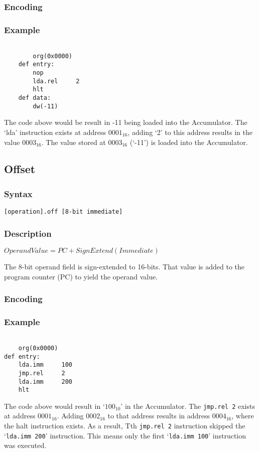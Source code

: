 \subsubsection{Encoding}
\subsubsection{Example}
\begin{verbatim}

        org(0x0000)
    def entry:
        nop
        lda.rel     2
        hlt
    def data:
        dw(-11)

\end{verbatim}
The code above would be result in -11 being loaded into the Accumulator.
The `lda' instruction exists at address $0001_{16}$, adding `2' to this address results in the value $0003_{16}$.
The value stored at $0003_{16}$ (`-11') is loaded into the Accumulator.
\pagebreak

\subsection{Offset}\label{subsec:relative-jump}
\subsubsection{Syntax}
\begin{verbatim}[operation].off [8-bit immediate]\end{verbatim}

\subsubsection{Description}
$OperandValue = PC + SignExtend(Immediate)$
\par The 8-bit operand field is sign-extended to 16-bits.
That value is added to the program counter (PC) to yield the operand value.

\subsubsection{Encoding}

\subsubsection{Example}
\begin{verbatim}

    org(0x0000)
def entry:
    lda.imm     100
    jmp.rel     2
    lda.imm     200
    hlt

\end{verbatim}
The code above would result in `$100_{10}$' in the Accumulator.
The \texttt{jmp.rel 2} exists at address $0001_{16}$.
Adding $0002_{16}$ to that address results in address $0004_{16}$, where the halt instruction exists.
As a result, Tth \texttt{jmp.rel 2} instruction skipped the `\texttt{lda.imm 200}' instruction.
This means only the first `\texttt{lda.imm 100}' instruction was executed.
\pagebreak

